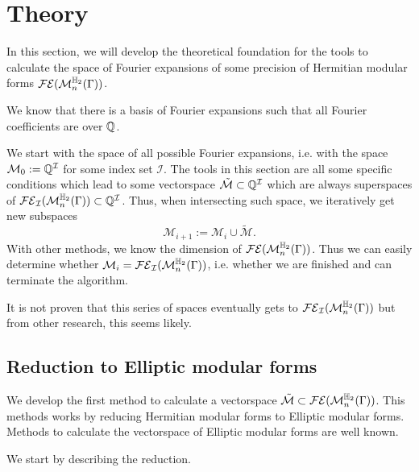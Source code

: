
\section{Theory}


In this section, we will develop the theoretical foundation for the tools to calculate the space of Fourier expansions of some precision of Hermitian modular forms $\mathcal{FE}(\operatorname{\mathcal{M}}^{\mathbb{H}_{2}}_n (\Gamma))$.

We know that there is a basis of Fourier expansions such that all Fourier coefficients are over $\mathbb{Q}$. %

We start with the space of all possible Fourier expansions, i.e. with the space $\mathcal{M}_0 := \mathbb{Q}^\mathcal{I}$ for some index set $\mathcal{I}$. The tools in this section are all some specific conditions which lead to some vectorspace $\tilde{\mathcal{M}} \subset \mathbb{Q}^\mathcal{I}$ which are always superspaces of $\mathcal{FE}_\mathcal{I}(\operatorname{\mathcal{M}}^{\mathbb{H}_{2}}_n (\Gamma)) \subset \mathbb{Q}^\mathcal{I}$. Thus, when intersecting such space, we iteratively get new subspaces
\[ \mathcal{M}_{i+1} := \mathcal{M}_i \cup \tilde{\mathcal{M}} . \]
%
With other methods, we know the dimension of $\mathcal{FE}(\operatorname{\mathcal{M}}^{\mathbb{H}_{2}}_n (\Gamma))$. Thus we can easily determine whether $\mathcal{M}_i = \mathcal{FE}_\mathcal{I}(\operatorname{\mathcal{M}}^{\mathbb{H}_{2}}_n (\Gamma))$, i.e. whether we are finished and can terminate the algorithm.

It is not proven that this series of spaces eventually gets to $\mathcal{FE}_\mathcal{I}(\operatorname{\mathcal{M}}^{\mathbb{H}_{2}}_n (\Gamma))$ but from other research, this seems likely.

\subsection{Reduction to Elliptic modular forms}

We develop the first method to calculate a vectorspace $\tilde{\mathcal{M}} \subset \mathcal{FE}(\operatorname{\mathcal{M}}^{\mathbb{H}_{2}}_n (\Gamma))$. This methods works by reducing Hermitian modular forms to Elliptic modular forms.
Methods to calculate the vectorspace of Elliptic modular forms are well known.

We start by describing the reduction.

